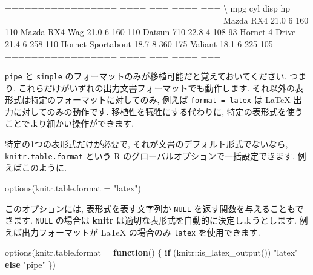 \documentclass[
  11pt,
]{bxjsreport}
\newenvironment{Shaded}{\begin{snugshade}}{\end{snugshade}}
\newcommand{\AttributeTok}[1]{\textcolor[rgb]{0.77,0.63,0.00}{#1}}
\newcommand{\ControlFlowTok}[1]{\textcolor[rgb]{0.13,0.29,0.53}{\textbf{#1}}}
\newcommand{\FunctionTok}[1]{\textcolor[rgb]{0.00,0.00,0.00}{#1}}
\newcommand{\NormalTok}[1]{#1}
\newcommand{\SpecialCharTok}[1]{\textcolor[rgb]{0.00,0.00,0.00}{#1}}
\newcommand{\StringTok}[1]{\textcolor[rgb]{0.31,0.60,0.02}{#1}}
\begin{document}
\begin{Shaded}
\begin{Highlighting}[]
\NormalTok{=================  ====  ===  ====  ===}
\NormalTok{\textbackslash{}                   mpg  cyl  disp   hp}
\NormalTok{=================  ====  ===  ====  ===}
\NormalTok{Mazda RX4          21.0    6   160  110}
\NormalTok{Mazda RX4 Wag      21.0    6   160  110}
\NormalTok{Datsun 710         22.8    4   108   93}
\NormalTok{Hornet 4 Drive     21.4    6   258  110}
\NormalTok{Hornet Sportabout  18.7    8   360  175}
\NormalTok{Valiant            18.1    6   225  105}
\NormalTok{=================  ====  ===  ====  ===}
\end{Highlighting}
\end{Shaded}

\texttt{pipe} と \texttt{simple} のフォーマットのみが移植可能だと覚えておいてください. つまり, これらだけがいずれの出力文書フォーマットでも動作します. それ以外の表形式は特定のフォーマットに対してのみ, 例えば \texttt{format = \textquotesingle{}latex\textquotesingle{}} は LaTeX 出力に対してのみの動作です. 移植性を犠牲にする代わりに, 特定の表形式を使うことでより細かい操作ができます.

特定の1つの表形式だけが必要で, それが文書のデフォルト形式でないなら, \texttt{knitr.table.format} という R のグローバルオプションで一括設定できます. 例えばこのように.

\begin{Shaded}
\begin{Highlighting}[numbers=left,,]
\FunctionTok{options}\NormalTok{(}\AttributeTok{knitr.table.format =} \StringTok{"latex"}\NormalTok{)}
\end{Highlighting}
\end{Shaded}

このオプションには, 表形式を表す文字列か \texttt{NULL} を返す関数を与えることもできます. \texttt{NULL} の場合は \textbf{knitr} は適切な表形式を自動的に決定しようとします. 例えば出力フォーマットが LaTeX の場合のみ \texttt{latex} を使用できます.

\begin{Shaded}
\begin{Highlighting}[numbers=left,,]
\FunctionTok{options}\NormalTok{(}\AttributeTok{knitr.table.format =} \ControlFlowTok{function}\NormalTok{() \{}
  \ControlFlowTok{if}\NormalTok{ (knitr}\SpecialCharTok{::}\FunctionTok{is\_latex\_output}\NormalTok{()) }
    \StringTok{"latex"} \ControlFlowTok{else} \StringTok{"pipe"}
\NormalTok{\})}
\end{Highlighting}
\end{Shaded}
\end{document}
